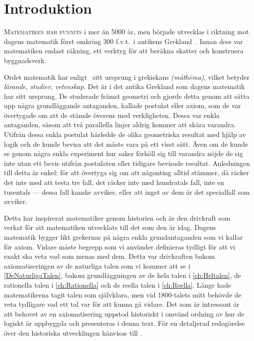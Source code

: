 %
%
%
%
\chapter{Introduktion}\label{Introduktion}
\lettrine{M}{atematiken har funnits} i mer än 5000 år, men började utvecklas i 
riktning mot dagens matematik först omkring 300 f.v.t.\ i antikens 
Grekland~\cite{Kline1990mtf1}.
Innan dess var matematiken endast räkning, ett verktyg för att beräkna skatter 
och konstruera byggnadsverk.

Ordet matematik har enligt~\cite{OED2013maths} sitt ursprung i grekiskans 
\emph{ (m{\'a}th{\=e}ma)}, vilket betyder \emph{lärande, 
studier, vetenskap}.
Det är i det antika Grekland som dagens matematik har sitt ursprung.
De studerade främst geometri och gjorde detta genom att sätta upp några 
grundläggande antaganden, kallade postulat eller axiom, som de var övertygade 
om att de stämde överens med verkligheten.
Dessa var enkla antaganden, såsom att två parallella linjer aldrig kommer att 
skära varandra.
Utifrån dessa enkla postulat härledde de olika geometriska resultat med hjälp 
av logik och de kunde bevisa att det måste vara på ett visst sätt.
Även om de kunde se genom några enkla experiment hur saker förhöll sig till 
varandra nöjde de sig inte utan ett bevis utifrån postulaten eller tidigare 
bevisade resultat.
Anledningen till detta är enkel: för att övertyga sig om att någonting alltid 
stämmer, då räcker det inte med att testa tre fall, det räcker inte med 
hundratals fall, inte en tusentals --- dessa fall kanske avviker, eller att 
inget av dem är det specialfall som avviker.

Detta har inspirerat matematiker genom historien och är den drivkraft som 
verkat för att matematiken utvecklats till det som den är idag.
Dagens matematik bygger likt grekernas på några enkla grundantaganden som vi 
kallar för axiom.
Vidare måste begrepp som vi använder definieras tydligt för att vi exakt ska 
veta vad som menas med dem.
Detta var drivkraften bakom axiomatiseringen av de naturliga talen som vi 
kommer att se i \cref{DeNaturligaTalen}, bakom grundläggningen av de hela 
talen i \cref{ch:Heltalen}, de rationella talen i 
\cref{ch:Rationella} och de reella talen i \cref{ch:Reella}.
Länge hade matematikerna tagit talen som självklara, men vid 1800-talets mitt 
behövde de veta tydligare vad ett tal var för att kunna gå vidare.
Det som är intressant är att behovet av en axiomatisering uppstod historiskt i 
omvänd ordning av hur de logiskt är uppbyggda och presenteras i denna text.
För en detaljerad redogörelse över den historiska utvecklingen hänvisas till 
\citet{Kline1990mtf3}.

